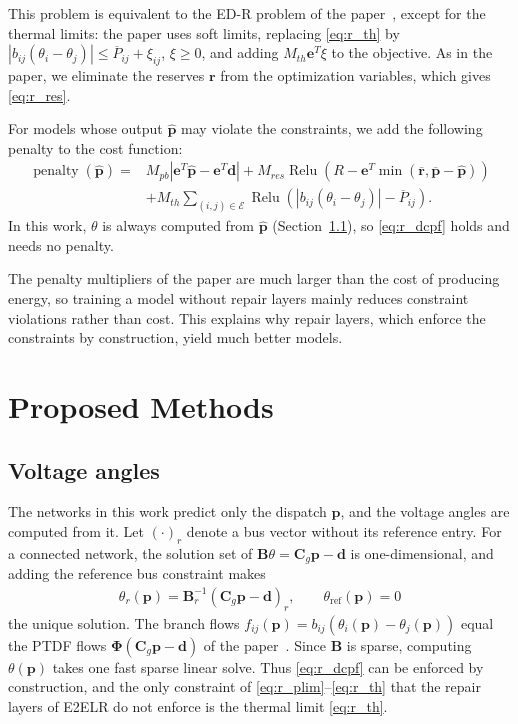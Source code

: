 \documentclass[12pt]{article}
\begin{document}
This problem is equivalent to the ED-R problem of the paper~\cite{Chen2023_E2ELR}, except for the thermal limits: the paper uses soft limits, replacing \eqref{eq:r_th} by $|b_{ij}(\theta_i - \theta_j)| \leq \overline{P}_{ij} + \xi_{ij}$, $\xi \geq 0$, and adding $M_{th} \mathbf{e}^T \xi$ to the objective.
As in the paper, we eliminate the reserves $\boldsymbol{r}$ from the optimization variables, which gives \eqref{eq:r_res}.

For models whose output $\hat{\boldsymbol{p}}$ may violate the constraints, we add the following penalty to the cost function:
\begin{align}
    \operatorname{penalty}(\hat{\boldsymbol{p}}) = {} & M_{pb} |\mathbf{e}^T \hat{\boldsymbol{p}} - \mathbf{e}^T \boldsymbol{d}| + M_{res} \operatorname{Relu}(R - \mathbf{e}^T \min(\overline{\boldsymbol{r}}, \overline{\boldsymbol{p}} - \hat{\boldsymbol{p}})) \nonumber \\
    & + M_{th} \sum_{(i,j) \in \mathcal{E}} \operatorname{Relu}(|b_{ij}(\theta_i - \theta_j)| - \overline{P}_{ij}). \label{eq:penalty}
\end{align}
In this work, $\theta$ is always computed from $\hat{\boldsymbol{p}}$ (Section~\ref{sec:angles}), so \eqref{eq:r_dcpf} holds and needs no penalty.

The penalty multipliers of the paper are much larger than the cost of producing energy, so training a model without repair layers mainly reduces constraint violations rather than cost. This explains why repair layers, which enforce the constraints by construction, yield much better models.

\section{Proposed Methods}
\subsection{Voltage angles} \label{sec:angles}
The networks in this work predict only the dispatch $\boldsymbol{p}$, and the voltage angles are computed from it. Let $(\cdot)_r$ denote a bus vector without its reference entry. For a connected network, the solution set of $\boldsymbol{B} \theta = \boldsymbol{C}_g \boldsymbol{p} - \boldsymbol{d}$ is one-dimensional, and adding the reference bus constraint makes
\begin{align}
\label{eq:angles}
    \theta_r(\boldsymbol{p}) = \boldsymbol{B}_r^{-1} (\boldsymbol{C}_g \boldsymbol{p} - \boldsymbol{d})_r, \qquad \theta_{\text{ref}}(\boldsymbol{p}) = 0
\end{align}
the unique solution.
The branch flows $f_{ij}(\boldsymbol{p}) = b_{ij}(\theta_i(\boldsymbol{p}) - \theta_j(\boldsymbol{p}))$ equal the PTDF flows $\boldsymbol{\Phi}(\boldsymbol{C}_g \boldsymbol{p} - \boldsymbol{d})$ of the paper~\cite{Chen2023_E2ELR}.
Since $\boldsymbol{B}$ is sparse, computing $\theta(\boldsymbol{p})$ takes one fast sparse linear solve.
Thus \eqref{eq:r_dcpf} can be enforced by construction, and the only constraint of \eqref{eq:r_plim}--\eqref{eq:r_th} that the repair layers of E2ELR do not enforce is the thermal limit \eqref{eq:r_th}.
\end{document}
